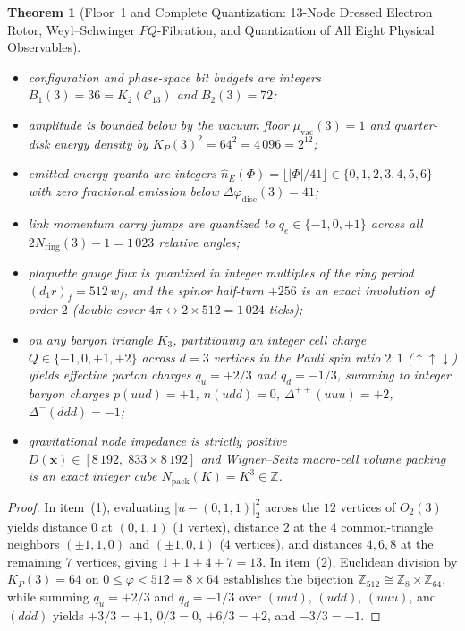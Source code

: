 \documentclass[11pt,a4paper]{article}
\theoremstyle{plain}
\newtheorem{theorem}{Theorem}[section]
\theoremstyle{definition}
\begin{document}
\begin{theorem}[Floor~1 and Complete Quantization: 13-Node Dressed Electron Rotor, Weyl--Schwinger $PQ$-Fibration, and Quantization of All Eight Physical Observables]
\begin{enumerate}[label=\textbf{(\arabic*)},leftmargin=*]
  \begin{itemize}[leftmargin=*]
  \item configuration and phase-space bit budgets are integers $B_1(3) = 36 = K_2(\mathcal{C}_{13})$ and $B_2(3) = 72$;
  \item amplitude is bounded below by the vacuum floor $\mu_{\mathrm{vac}}(3) = 1$ and quarter-disk energy density by $K_P(3)^2 = 64^2 = 4\,096 = 2^{12}$;
  \item emitted energy quanta are integers $\hat{n}_E(\Phi) = \lfloor|\Phi|/41\rfloor \in \{0, 1, 2, 3, 4, 5, 6\}$ with zero fractional emission below $\Delta\varphi_{\mathrm{disc}}(3) = 41$;
  \item link momentum carry jumps are quantized to $q_e \in \{-1, 0, +1\}$ across all $2 N_{\mathrm{ring}}(3) - 1 = 1\,023$ relative angles;
  \item plaquette gauge flux is quantized in integer multiples of the ring period $(d_1 r)_f = 512\,w_f$, and the spinor half-turn $+256$ is an exact involution of order $2$ (double cover $4\pi \leftrightarrow 2\times 512 = 1\,024$ ticks);
  \item on any baryon triangle $K_3$, partitioning an integer cell charge $Q \in \{-1, 0, +1, +2\}$ across $d = 3$ vertices in the Pauli spin ratio $2 : 1$ ($\uparrow\uparrow\downarrow$) yields effective parton charges $q_u = +2/3$ and $q_d = -1/3$, summing to integer baryon charges $p(uud) = +1$, $n(udd) = 0$, $\Delta^{++}(uuu) = +2$, $\Delta^-(ddd) = -1$;
  \item gravitational node impedance is strictly positive $D(\mathbf{x}) \in [8\,192,\; 833\times 8\,192]$ and Wigner--Seitz macro-cell volume packing is an exact integer cube $N_{\mathrm{pack}}(K) = K^3 \in \mathbb{Z}$.
  \end{itemize}
\end{enumerate}
\end{theorem}

\begin{proof}
In item~(1), evaluating $|u - (0,1,1)|_2^2$ across the $12$ vertices of $O_2(3)$ yields distance $0$ at $(0,1,1)$ ($1$ vertex), distance $2$ at the $4$ common-triangle neighbors $(\pm 1, 1, 0)$ and $(\pm 1, 0, 1)$ ($4$ vertices), and distances $4, 6, 8$ at the remaining $7$ vertices, giving $1 + 1 + 4 + 7 = 13$. In item~(2), Euclidean division by $K_P(3) = 64$ on $0 \le \varphi < 512 = 8 \times 64$ establishes the bijection $\mathbb{Z}_{512} \cong \mathbb{Z}_8 \times \mathbb{Z}_{64}$, while summing $q_u = +2/3$ and $q_d = -1/3$ over $(uud)$, $(udd)$, $(uuu)$, and $(ddd)$ yields $+3/3 = +1$, $0/3 = 0$, $+6/3 = +2$, and $-3/3 = -1$.
\end{proof}
\end{document}
